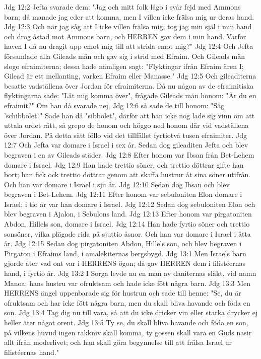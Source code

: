 Jdg 12:2  Jefta svarade dem: "Jag och mitt folk lågo i svår fejd med Ammons barn; då manade jag eder att komma, men I villen icke frälsa mig ur deras hand.
Jdg 12:3  Och när jag såg att I icke villen frälsa mig, tog jag min själ i min hand och drog åstad mot Ammons barn, och HERREN gav dem i min hand. Varför haven I då nu dragit upp emot mig till att strida emot mig?"
Jdg 12:4  Och Jefta församlade alla Gileads män och gav sig i strid med Efraim. Och Gileads män slogo efraimiterna; dessa hade nämligen sagt: "Flyktingar ifrån Efraim ären I; Gilead är ett mellanting, varken Efraim eller Manasse."
Jdg 12:5  Och gileaditerna besatte vadställena över Jordan för efraimiterna. Då nu någon av de efraimitiska flyktingarna sade: "Låt mig komma över", frågade Gileads män honom: "Är du en efraimit?" Om han då svarade nej,
Jdg 12:6  så sade de till honom: "Säg 'schibbolet'." Sade han då "sibbolet", därför att han icke nog lade sig vinn om att uttala ordet rätt, så grepo de honom och höggo ned honom där vid vadställena över Jordan. På detta sätt föllo vid det tillfället fyrtiotvå tusen efraimiter.
Jdg 12:7  Och Jefta var domare i Israel i sex år. Sedan dog gileaditen Jefta och blev begraven i en av Gileads städer.
Jdg 12:8  Efter honom var Ibsan från Bet-Lehem domare i Israel.
Jdg 12:9  Han hade trettio söner, och trettio döttrar gifte han bort; han fick ock trettio döttrar genom att skaffa hustrur åt sina söner utifrån. Och han var domare i Israel i sju år.
Jdg 12:10  Sedan dog Ibsan och blev begraven i Bet-Lehem.
Jdg 12:11  Efter honom var sebuloniten Elon domare i Israel; i tio år var han domare i Israel.
Jdg 12:12  Sedan dog sebuloniten Elon och blev begraven i Ajalon, i Sebulons land.
Jdg 12:13  Efter honom var pirgatoniten Abdon, Hillels son, domare i Israel.
Jdg 12:14  Han hade fyrtio söner och trettio sonsöner, vilka plägade rida på sjuttio åsnor. Och han var domare i Israel i åtta år.
Jdg 12:15  Sedan dog pirgatoniten Abdon, Hillels son, och blev begraven i Pirgaton i Efraims land, i amalekiternas bergsbygd.
Jdg 13:1  Men Israels barn gjorde åter vad ont var i HERRENS ögon; då gav HERREN dem i filistéernas hand, i fyrtio år.
Jdg 13:2  I Sorga levde nu en man av daniternas släkt, vid namn Manoa; hans hustru var ofruktsam och hade icke fött några barn.
Jdg 13:3  Men HERRENS ängel uppenbarade sig för hustrun och sade till henne: "Se, du är ofruktsam och har icke fött några barn, men du skall bliva havande och föda en son.
Jdg 13:4  Tag dig nu till vara, så att du icke dricker vin eller starka drycker ej heller äter något orent.
Jdg 13:5  Ty se, du skall bliva havande och föda en son, på vilkens huvud ingen rakkniv skall komma, ty gossen skall vara en Guds nasir allt ifrån moderlivet; och han skall göra begynnelse till att frälsa Israel ur filistéernas hand."
